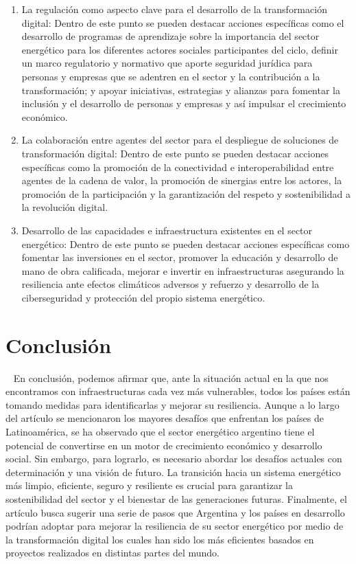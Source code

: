 \documentclass{article}
\begin{document}
\begin{enumerate}
\def\labelenumi{\arabic{enumi}.}
\item
  La regulación como aspecto clave para el desarrollo de la
  transformación digital: Dentro de este punto se pueden destacar
  acciones específicas como el desarrollo de programas de aprendizaje
  sobre la importancia del sector energético para los diferentes actores
  sociales participantes del ciclo, definir un marco regulatorio y
  normativo que aporte seguridad jurídica para personas y empresas que
  se adentren en el sector y la contribución a la transformación; y
  apoyar iniciativas, estrategias y alianzas para fomentar la inclusión
  y el desarrollo de personas y empresas y así impulsar el crecimiento
  económico.
\item
  La colaboración entre agentes del sector para el despliegue de
  soluciones de transformación digital: Dentro de este punto se pueden
  destacar acciones específicas como la promoción de la conectividad e
  interoperabilidad entre agentes de la cadena de valor, la promoción de
  sinergias entre los actores, la promoción de la participación y la
  garantización del respeto y sostenibilidad a la revolución digital.
\item
  Desarrollo de las capacidades e infraestructura existentes en el
  sector energético: Dentro de este punto se pueden destacar acciones
  específicas como fomentar las inversiones en el sector, promover la
  educación y desarrollo de mano de obra calificada, mejorar e invertir
  en infraestructuras asegurando la resiliencia ante efectos climáticos
  adversos y refuerzo y desarrollo de la ciberseguridad y protección del
  propio sistema energético.
\end{enumerate}

\hypertarget{conclusiuxf3n}{%
\section{Conclusión}\label{conclusiuxf3n}}

~ En conclusión, podemos afirmar que, ante la situación actual en la que
nos encontramos con infraestructuras cada vez más vulnerables, todos los
países están tomando medidas para identificarlas y mejorar su
resiliencia. Aunque a lo largo del artículo se mencionaron los mayores
desafíos que enfrentan los países de Latinoamérica, se ha observado que
el sector energético argentino tiene el potencial de convertirse en un
motor de crecimiento económico y desarrollo social. Sin embargo, para
lograrlo, es necesario abordar los desafíos actuales con determinación y
una visión de futuro. La transición hacia un sistema energético más
limpio, eficiente, seguro y resiliente es crucial para garantizar la
sostenibilidad del sector y el bienestar de las generaciones futuras.
Finalmente, el artículo busca sugerir una serie de pasos que Argentina y
los países en desarrollo podrían adoptar para mejorar la resiliencia de
su sector energético por medio de la transformación digital los cuales
han sido los más eficientes basados en proyectos realizados en distintas
partes del mundo.
\end{document}
